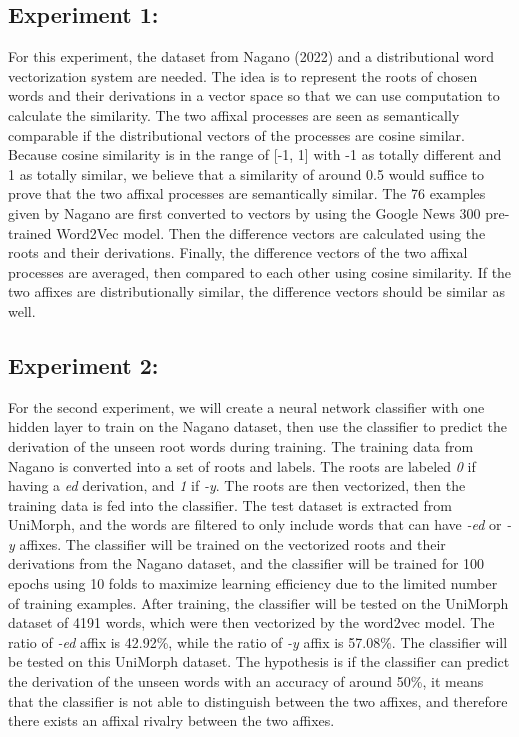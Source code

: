 \documentclass[12pt]{article}
\begin{document}
\subsection{Experiment 1:}
    For this experiment, the dataset from Nagano (2022) and a distributional word vectorization system are needed. The idea is to represent the roots of chosen words and their derivations in a vector space so that we can use computation to calculate the similarity. The two affixal processes are seen as semantically comparable if the distributional vectors of the processes are cosine similar. Because cosine similarity is in the range of [-1, 1] with -1 as totally different and 1 as totally similar, we believe that a similarity of around 0.5 would suffice to prove that the two affixal processes are semantically similar. The 76 examples given by Nagano are first converted to vectors by using the Google News 300 pre-trained Word2Vec model. Then the difference vectors are calculated using the roots and their derivations. Finally, the difference vectors of the two affixal processes are averaged, then compared to each other using cosine similarity. If the two affixes are distributionally similar, the difference vectors should be similar as well.

\subsection{Experiment 2:}
    For the second experiment, we will create a neural network classifier with one hidden layer to train on the Nagano dataset, then use the classifier to predict the derivation of the unseen root words during training. The training data from Nagano is converted into a set of roots and labels. The roots are labeled \emph{0} if having a \emph{ed} derivation, and \emph{1} if \emph{-y}. The roots are then vectorized, then the training data is fed into the classifier. The test dataset is extracted from UniMorph, and the words are filtered to only include words that can have \emph{-ed} or \emph{-y} affixes. The classifier will be trained on the vectorized roots and their derivations from the Nagano dataset, and the classifier will be trained for 100 epochs using 10 folds to maximize learning efficiency due to the limited number of training examples. After training, the classifier will be tested on the UniMorph dataset of 4191 words, which were then vectorized by the word2vec model. The ratio of \emph{-ed} affix is 42.92\%, while the ratio of \emph{-y} affix is 57.08\%. The classifier will be tested on this UniMorph dataset. The hypothesis is if the classifier can predict the derivation of the unseen words with an accuracy of around 50\%, it means that the classifier is not able to distinguish between the two affixes, and therefore there exists an affixal rivalry between the two affixes.
\end{document}
